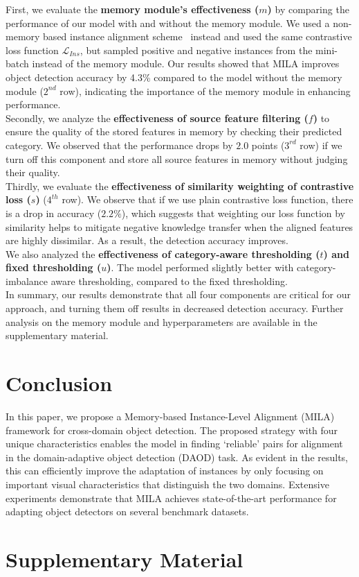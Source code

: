 \documentclass{bmvc2k}
\begin{document}
First, we evaluate the \textbf{memory module's effectiveness ($m$)} by comparing the performance of our model with and without the memory module. We used a non-memory based instance alignment scheme~\cite{xu2020cross} instead and used the same contrastive loss function $\mathcal{L}_{Ins}$, but sampled positive and negative instances from the mini-batch instead of the memory module. Our results showed that MILA improves object detection accuracy by 4.3\% compared to the model without the memory module ($2^{nd}$ row), indicating the importance of the memory module in enhancing performance. \\
Secondly, we analyze the \textbf{effectiveness of source feature filtering ($f$)} to ensure the quality of the stored features in memory by checking their predicted category. We observed that the performance drops by $2.0$ points ($3^{rd}$ row) if we turn off this component and store all source features in memory without judging their quality.
\\
Thirdly, we evaluate the \textbf{effectiveness of similarity weighting of contrastive loss ($s$)} ($4^{th}$ row). We observe that if we use plain contrastive loss function, there is a drop in accuracy ($2.2\%$), which suggests that weighting our loss function by similarity helps to mitigate negative knowledge transfer when the aligned features are highly dissimilar. As a result, the detection accuracy improves.
\\
We also analyzed the \textbf{effectiveness of category-aware thresholding ($t$) and fixed thresholding ($u$)}. The model performed slightly better with category-imbalance aware thresholding, compared to the fixed thresholding. \\
In summary, our results demonstrate that all four components are critical for our approach, and turning them off results in decreased detection accuracy. Further analysis on the memory module and hyperparameters are available in the supplementary material.









\section{Conclusion}
In this paper, we propose a Memory-based Instance-Level Alignment (MILA) framework for cross-domain object detection. 
The proposed strategy with four unique characteristics enables the model in finding ‘reliable’ pairs for alignment in the domain-adaptive object detection (DAOD) task. As evident in the results, this can efficiently improve the adaptation of instances by only focusing on important visual characteristics that distinguish the two domains. Extensive experiments demonstrate that MILA achieves state-of-the-art performance for adapting object detectors on several benchmark datasets.






\section{Supplementary Material}

\end{document}
